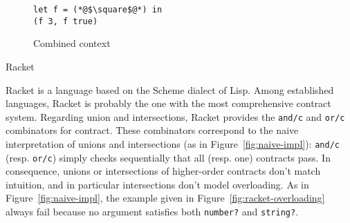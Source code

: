\documentclass[sigplan,10pt,review,anonymous]{acmart}
\newcommand{\resolved}[2]{}
\newcommand{\racket}[1]{\lstinline[language=racket]{#1}}
\begin{document}
\begin{figure}[h]
\begin{lstlisting}[language=nickel]
let f = (*@$\square$@*) in
(f 3, f true)
\end{lstlisting}
\caption{Combined context}
\label{fig:invalid-context}
\end{figure}





\resolved{(Yann) Maybe adding a concrete example of this (it can be the same term but with
    concrete types like Number and String and simple contexts like application
    to a dumb argument) is sufficient to make the point}

\subsection{Racket}
\label{sec:racket}

Racket is a language based on the Scheme dialect of Lisp. Among established
languages, Racket is probably the one with the most comprehensive contract
system\cite{RacketContracts}. Regarding union and intersections, Racket provides
the \racket{and/c} and \racket{or/c} combinators for contract.  These
combinators correspond to the naive interpretation of unions and intersections
(as in Figure~\ref{fig:naive-impl}): \racket{and/c} (resp.  \racket{or/c})
simply checks sequentially that all (resp. one) contracts pass.  In consequence,
unions or intersections of higher-order contracts don't match intuition, and in
particular intersections don't model overloading. As in
Figure~\ref{fig:naive-impl}, the example given in
Figure~\ref{fig:racket-overloading} always fail because no argument satisfies
both \racket{number?} and \racket{string?}.
\end{document}
